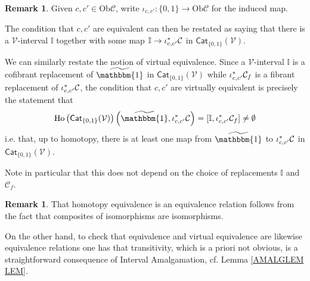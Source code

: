 \documentclass[a4paper,10pt
,draft
]{article}%
\numberwithin{equation}{section}
\numberwithin{figure}{section}
\newtheorem{proposition}[equation]{Proposition}%
\theoremstyle{definition} %
\newtheorem{remark}[equation]{Remark}%
\DeclareMathOperator{\Ho}{Ho}
\newcommand{\V}{\ensuremath{\mathcal V}}
\renewcommand{\O}{\ensuremath{\mathcal O}}
\newcommand{\J}{\mathbb J}
\newcommand{\1}{\ensuremath{\mathbbm 1}}%
\begin{document}
\begin{remark}\label{VIRTEQRESTA REM}
Given $c,c' \in \mathrm{Ob}{\mathcal{C}}$, write $\iota_{c,c'} \colon \{0,1\} \to \mathrm{Ob}{\mathcal{C}}$
for the induced map.

The condition that $c,c'$ are equivalent can then be restated as saying that
there is a $\V$-interval $\mathbb{I}$
together with some map $\mathbb{I} \to \iota^{\**}_{c,c'}\mathcal{C}$ in $\mathsf{Cat}_{\{0,1\}}(\V)$. 

We can similarly restate the notion of virtual equivalence.
Since a $\V$-interval $\mathbb{I}$ is a cofibrant replacement of $\widetilde{\mathbbm{1}}$ in $\mathsf{Cat}_{\{0,1\}}(\V)$
while $\iota^{\**}_{c,c'} \mathcal{C}_f$ is a fibrant replacement of $\iota^{\**}_{c,c'} \mathcal{C}$,
the condition that $c,c'$ are virtually equivalent is precisely the statement that
\[
\Ho \left(\mathsf{Cat}_{\{0,1\}}(\V)\right)\left(\widetilde{\mathbbm{1}},\iota^{\**}_{c,c'} \mathcal{C}\right)
=
[\mathbb{I},\iota^{\**}_{c,c'} \mathcal{C}_f] 
\neq
 \emptyset
\]
i.e. that, up to homotopy, there is at least one map from $\widetilde{\mathbbm{1}}$ to $\iota^{\**}_{c,c'} \mathcal{C}$
in $\mathsf{Cat}_{\{0,1\}}(\V)$.

Note in particular that this does not depend on the choice of %
replacements 
$\mathbb{I}$ and $\mathcal{C}_f$.
\end{remark}


\begin{remark}
That homotopy equivalence is an equivalence relation 
follows from the fact that composites of isomorphisms are isomorphisms.

On the other hand, to check that equivalence and virtual equivalence are likewise equivalence relations
one has that transitivity, which is a priori not obvious,
is a straightforward consequence of Interval Amalgamation, cf. Lemma \ref{AMALGLEM LEM}.
\end{remark}



\end{document}
